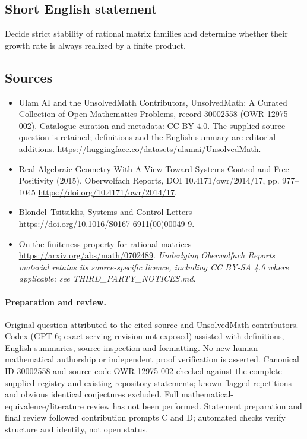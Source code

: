 \documentclass[11pt]{article}
\begin{document}
\subsection{Short English statement}
Decide strict stability of rational matrix families and determine whether their growth rate is always realized by a finite product.
\subsection{Sources}
\begin{itemize}
\item[\hypertarget{source:30002558:1}{S1}] Ulam AI and the UnsolvedMath Contributors, UnsolvedMath: A Curated Collection of Open Mathematics Problems, record 30002558 (OWR-12975-002). Catalogue curation and metadata: CC BY 4.0. The supplied source question is retained; definitions and the English summary are editorial additions.
\url{https://huggingface.co/datasets/ulamai/UnsolvedMath}.
\item[\hypertarget{source:30002558:2}{S2}] Real Algebraic Geometry With A View Toward Systems Control and Free Positivity (2015), Oberwolfach Reports, DOI 10.4171/owr/2014/17, pp. 977--1045
\url{https://doi.org/10.4171/owr/2014/17}.
\item[\hypertarget{source:30002558:3}{S3}] Blondel--Tsitsiklis, Systems and Control Letters
\url{https://doi.org/10.1016/S0167-6911(00)00049-9}.
\item[\hypertarget{source:30002558:4}{S4}] On the finiteness property for rational matrices
\url{https://arxiv.org/abs/math/0702489}.
\textit{Underlying Oberwolfach Reports material retains its source-specific licence, including CC BY-SA 4.0 where applicable; see THIRD\_PARTY\_NOTICES.md.}
\end{itemize}
\paragraph{Preparation and review.}
Original question attributed to the cited source and UnsolvedMath contributors. Codex (GPT-6; exact serving revision not exposed) assisted with definitions, English summaries, source inspection and formatting. No new human mathematical authorship or independent proof verification is asserted. Canonical ID 30002558 and source code OWR-12975-002 checked against the complete supplied registry and existing repository statements; known flagged repetitions and obvious identical conjectures excluded. Full mathematical-equivalence/literature review has not been performed. Statement preparation and final review followed contribution prompts C and D; automated checks verify structure and identity, not open status.
\label{end:30002558}
\end{document}
